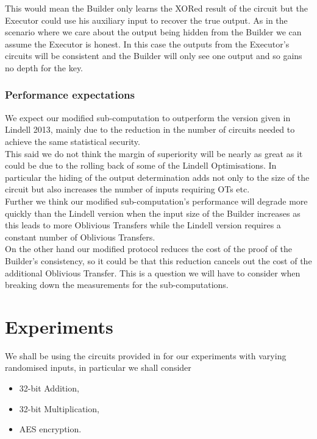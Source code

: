 \documentclass[ %
                    author={Nicholas Tutte},
                supervisor={Prof. Nigel Smart},
                    degree={MEng},
                     title={Secure Two Party Computation},
                  subtitle={A practical comparison of recent protocols},
                      type={Research - GG1K},
                      year={2015} ]{dissertation}
\begin{document}
				This would mean the Builder only learns the XORed result of the circuit but the Executor could use his auxiliary input to recover the true output. As in the scenario where we care about the output being hidden from the Builder we can assume the Executor is honest. In this case the outputs from the Executor's circuits will be consistent and the Builder will only see one output and so gains no depth for the key.\\

			\subsection{Performance expectations}

				We expect our modified sub-computation to outperform the version given in Lindell 2013, mainly due to the reduction in the number of circuits needed to achieve the same statistical security.\\

				This said we do not think the margin of superiority will be nearly as great as it could be due to the rolling back of some of the Lindell Optimisations. In particular the hiding of the output determination adds not only to the size of the circuit but also increases the number of inputs requiring OTs etc.\\

				Further we think our modified sub-computation's performance will degrade more quickly than the Lindell version when the input size of the Builder increases as this leads to more Oblivious Transfers while the Lindell version requires a constant number of Oblivious Transfers.\\

				On the other hand our modified protocol reduces the cost of the proof of the Builder's consistency, so it could be that this reduction cancels out the cost of the additional Oblivious Transfer. This is a question we will have to consider when breaking down the measurements for the sub-computations.

	\chapter{Experiments} \label{sec:Results}
		We shall be using the circuits provided in \cite{NigelCircuits} for our experiments with varying randomised inputs, in particular we shall consider
		
		\begin{itemize}
			\setlength\itemsep{0.2em}
			\item 32-bit Addition,
			\item 32-bit Multiplication,
			\item AES encryption.
		\end{itemize} \vspace{-0.9cm}
\end{document}
